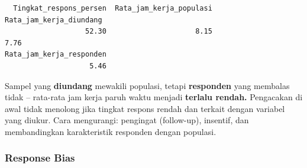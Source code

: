 \documentclass[
  indonesian,
  letterpaper,
]{book}
\newenvironment{Shaded}{\begin{snugshade}}{\end{snugshade}}
\newcommand{\AttributeTok}[1]{\textcolor[rgb]{0.40,0.45,0.13}{#1}}
\newcommand{\CommentTok}[1]{\textcolor[rgb]{0.37,0.37,0.37}{#1}}
\newcommand{\DecValTok}[1]{\textcolor[rgb]{0.68,0.00,0.00}{#1}}
\newcommand{\FloatTok}[1]{\textcolor[rgb]{0.68,0.00,0.00}{#1}}
\newcommand{\FunctionTok}[1]{\textcolor[rgb]{0.28,0.35,0.67}{#1}}
\newcommand{\NormalTok}[1]{\textcolor[rgb]{0.00,0.23,0.31}{#1}}
\newcommand{\OtherTok}[1]{\textcolor[rgb]{0.00,0.23,0.31}{#1}}
\newcommand{\SpecialCharTok}[1]{\textcolor[rgb]{0.37,0.37,0.37}{#1}}
\begin{document}
\begin{Shaded}
\end{Shaded}

\begin{verbatim}
  Tingkat_respons_persen  Rata_jam_kerja_populasi  Rata_jam_kerja_diundang 
                   52.30                     8.15                     7.76 
Rata_jam_kerja_responden 
                    5.46 
\end{verbatim}

Sampel yang \textbf{diundang} mewakili populasi, tetapi
\textbf{responden} yang membalas tidak -- rata-rata jam kerja paruh
waktu menjadi \textbf{terlalu rendah.} Pengacakan di awal tidak menolong
jika tingkat respons rendah dan terkait dengan variabel yang diukur.
Cara mengurangi: pengingat (follow-up), insentif, dan membandingkan
karakteristik responden dengan populasi.

\subsubsection{Response Bias}\label{response-bias}
\end{document}
